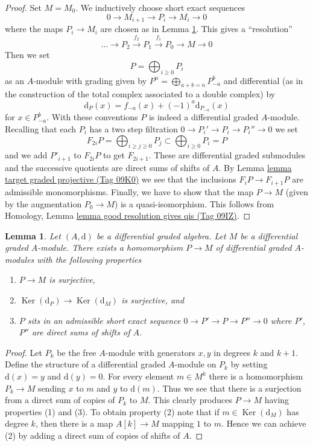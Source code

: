 \documentclass{amsart}
\theoremstyle{plain}
\newtheorem{lemma}[subsection]{Lemma}
\theoremstyle{definition}
\theoremstyle{remark}
\numberwithin{equation}{subsection}
\def\Ker{\mathop{\mathrm{Ker}}}
\begin{document}
\begin{proof}
Set $M = M_0$. We inductively choose short exact sequences
$$
0 \to M_{i + 1} \to P_i \to M_i \to 0
$$
where the maps $P_i \to M_i$ are chosen as in Lemma \ref{lemma-good-quotient}.
This gives a ``resolution''
$$
\ldots \to P_2 \xrightarrow{f_2} P_1 \xrightarrow{f_1} P_0 \to M \to 0
$$
Then we set
$$
P = \bigoplus\nolimits_{i \geq 0} P_i
$$
as an $A$-module with grading given by
$P^n = \bigoplus_{a + b = n} P_{-a}^b$ and
differential (as in the construction of the total complex associated
to a double complex) by
$$
\text{d}_P(x) = f_{-a}(x) + (-1)^a \text{d}_{P_{-a}}(x)
$$
for $x \in P_{-a}^b$. With these conventions $P$ is indeed a differential
graded $A$-module. Recalling that each $P_i$ has a two step filtration
$0 \to P_i' \to P_i \to P_i'' \to 0$ we set
$$
F_{2i}P = \bigoplus\nolimits_{i \geq j \geq 0} P_j
\subset
\bigoplus\nolimits_{i \geq 0} P_i = P
$$
and we add $P'_{i + 1}$ to $F_{2i}P$ to get $F_{2i + 1}$.
These are differential graded submodules and the successive quotients
are direct sums of shifts of $A$. By
Lemma \href{https://stacks.math.columbia.edu/tag/09K0}{lemma target graded projective (Tag 09K0)} we see that
the inclusions $F_iP \to F_{i + 1}P$ are admissible monomorphisms.
Finally, we have to show that the map $P \to M$ (given by the
augmentation $P_0 \to M$) is a quasi-isomorphism. This follows from
Homology, Lemma \href{https://stacks.math.columbia.edu/tag/09IZ}{lemma good resolution gives qis (Tag 09IZ)}.
\end{proof}


\begin{lemma}
\label{lemma-good-quotient}
Let $(A, \text{d})$ be a differential graded algebra.
Let $M$ be a differential graded $A$-module. There exists a homomorphism
$P \to M$ of differential graded $A$-modules with the following
properties
\begin{enumerate}
\item $P \to M$ is surjective,
\item $\Ker(\text{d}_P) \to \Ker(\text{d}_M)$ is surjective, and
\item $P$ sits in an admissible short exact sequence
$0 \to P' \to P \to P'' \to 0$ where $P'$, $P''$ are direct sums
of shifts of $A$.
\end{enumerate}
\end{lemma}

\begin{proof}
Let $P_k$ be the free $A$-module with generators $x, y$ in degrees
$k$ and $k + 1$. Define the structure of a differential graded
$A$-module on $P_k$ by setting $\text{d}(x) = y$ and $\text{d}(y) = 0$.
For every element $m \in M^k$ there is a homomorphism
$P_k \to M$ sending $x$ to $m$ and $y$ to $\text{d}(m)$.
Thus we see that there is a surjection from a direct sum
of copies of $P_k$ to $M$. This clearly produces $P \to M$
having properties (1) and (3). To obtain property (2) note
that if $m \in \Ker(\text{d}_M)$ has degree $k$, then there is a map
$A[k] \to M$ mapping $1$ to $m$. Hence we can achieve (2) by adding
a direct sum of copies of shifts of $A$.
\end{proof}
\end{document}
